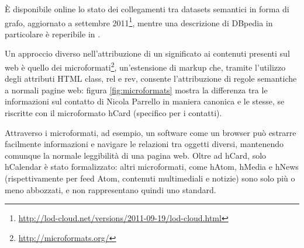 \documentclass[sigproc-sp.tex]{subfiles}
\begin{document}
\`{E} disponibile online lo stato dei collegamenti tra datasets semantici in forma di grafo, aggiornato a settembre 2011\footnote{\url{http://lod-cloud.net/versions/2011-09-19/lod-cloud.html}}, mentre una descrizione di DBpedia in particolare è reperibile in \cite{bizer2009dbpedia}.

Un approccio diverso nell’attribuzione di un significato ai contenuti presenti sul web è quello dei microformati\footnote{\url{http://microformats.org/}}, un’estensione di markup che, tramite l’utilizzo degli attributi HTML class, rel e rev, consente l’attribuzione di regole semantiche a normali pagine web: figura \ref{fig:microformats} mostra la differenza tra le informazioni sul contatto di Nicola Parrello in maniera canonica e le stesse, se 
riscritte con il microformato hCard (specifico per i contatti).

Attraverso i microformati, ad esempio, un software come un browser può estrarre facilmente informazioni e navigare le relazioni tra oggetti diversi, mantenendo comunque la normale leggibilità di una pagina web. Oltre ad hCard, solo hCalendar è stato formalizzato: altri microformati, come hAtom, hMedia e hNews (rispettivamente per feed Atom, contenuti multimediali e notizie) sono solo più o meno abbozzati, e non rappresentano quindi uno standard.
\end{document}
